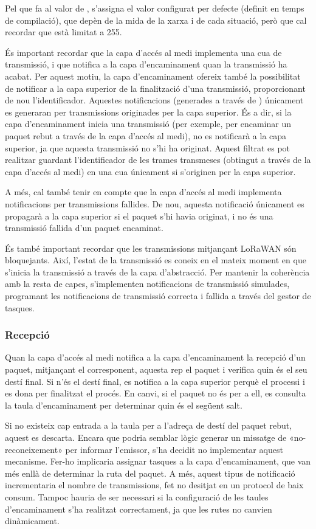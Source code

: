 \documentclass{tfgitic}[2024/07/01]
\begin{document}
{Pel que fa al valor de , s'assigna el valor configurat per defecte (definit en temps de compilació), que depèn de la mida de la xarxa i de cada situació, però que cal recordar que està limitat a 255.

És important recordar que la capa d'accés al medi implementa una cua de transmissió, i que notifica a la capa d'encaminament quan la transmissió ha acabat. Per aquest motiu, la capa d'encaminament ofereix també la possibilitat de notificar a la capa superior de la finalització d'una transmissió, proporcionant de nou l'identificador. Aquestes notificacions (generades a través de ) únicament es generaran per transmissions originades per la capa superior. És a dir, si la capa d'encaminament inicia una transmissió (per exemple, per encaminar un paquet rebut a través de la capa d'accés al medi), no es notificarà a la capa superior, ja que aquesta transmissió no s'hi ha originat. Aquest filtrat es pot realitzar guardant l'identificador de les trames transmeses (obtingut a través de la capa d'accés al medi) en una cua únicament si s'originen per la capa superior.

A més, cal també tenir en compte que la capa d'accés al medi implementa notificacions per transmissions fallides. De nou, aquesta notificació únicament es propagarà a la capa superior si el paquet s'hi havia originat, i no és una transmissió fallida d'un paquet encaminat. 

És també important recordar que les transmissions mitjançant LoRaWAN són bloquejants. Així, l'estat de la transmissió es coneix en el mateix moment en que s'inicia la transmissió a través de la capa d'abstracció. Per mantenir la coherència amb la resta de capes, s'implementen notificacions de transmissió simulades, programant les notificacions de transmissió correcta i fallida a través del gestor de tasques.
\subsubsection{Recepció}
\label{subsubsec:routing_rx}
Quan la capa d'accés al medi notifica a la capa d'encaminament la recepció d'un paquet, mitjançant el  corresponent, aquesta rep el paquet i verifica quin és el seu destí final. Si n'és el destí final, es notifica a la capa superior perquè el processi i es dona per finalitzat el procés. En canvi, si el paquet no és per a ell, es consulta la taula d'encaminament per determinar quin és el següent salt.

Si no existeix cap entrada a la taula per a l'adreça de destí del paquet rebut, aquest es descarta. Encara que podria semblar lògic generar un missatge de «no-reconeixement» per informar l'emissor, s'ha decidit no implementar aquest mecanisme. Fer-ho implicaria assignar tasques a la capa d'encaminament, que van més enllà de determinar la ruta del paquet. A més, aquest tipus de notificació incrementaria el nombre de transmissions, fet no desitjat en un protocol de baix consum. Tampoc hauria de ser necessari si la configuració de les taules d'encaminament s'ha realitzat correctament, ja que les rutes no canvien dinàmicament.

}
\end{document}
